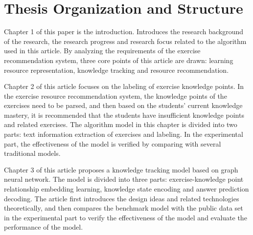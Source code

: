 \section{Thesis Organization and Structure}


Chapter 1 of this paper is the introduction. Introduces the research background of the research, the research progress and research focus related to the algorithm used in this article. By analyzing the requirements of the exercise recommendation system, three core points of this article are drawn: learning resource representation, knowledge tracking and resource recommendation.

Chapter 2 of this article focuses on the labeling of exercise knowledge points. In the exercise resource recommendation system, the knowledge points of the exercises need to be parsed, and then based on the students' current knowledge mastery, it is recommended that the students have insufficient knowledge points and related exercises. The algorithm model in this chapter is divided into two parts: text information extraction of exercises and labeling. In the experimental part, the effectiveness of the model is verified by comparing with several traditional models.

Chapter 3 of this article proposes a knowledge tracking model based on graph neural network. The model is divided into three parts: exercise-knowledge point relationship embedding learning, knowledge state encoding and answer prediction decoding. The article first introduces the design ideas and related technologies theoretically, and then compares the benchmark model with the public data set in the experimental part to verify the effectiveness of the model and evaluate the performance of the model.

